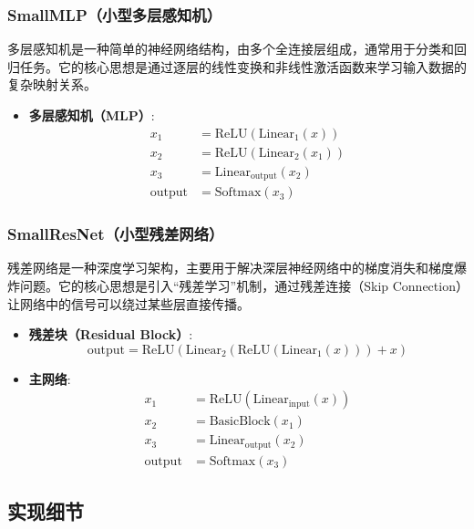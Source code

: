 \documentclass[10pt,a4paper,twoside]{article}
\numberwithin{figure}{section}%
\numberwithin{table}{section}%
\begin{document}
\subsubsection{SmallMLP（小型多层感知机）}

多层感知机是一种简单的神经网络结构，由多个全连接层组成，通常用于分类和回归任务。它的核心思想是通过逐层的线性变换和非线性激活函数来学习输入数据的复杂映射关系。

\begin{itemize}
    \item \textbf{多层感知机（MLP）}:
    $$\begin{aligned}
        x_1 &= \text{ReLU}(\text{Linear}_1(x)) \\
        x_2 &= \text{ReLU}(\text{Linear}_2(x_1)) \\
        x_3 &= \text{Linear}_{\text{output}}(x_2) \\
        \text{output} &= \text{Softmax}(x_3)
    \end{aligned}$$
\end{itemize}

\subsubsection{SmallResNet（小型残差网络）}

残差网络是一种深度学习架构，主要用于解决深层神经网络中的梯度消失和梯度爆炸问题。它的核心思想是引入“残差学习”机制，通过残差连接（Skip Connection）让网络中的信号可以绕过某些层直接传播。

\begin{itemize}
    \item \textbf{残差块（Residual Block）}:
    $$\text{output} = \text{ReLU}(\text{Linear}_2(\text{ReLU}(\text{Linear}_1(x))) + x)$$
    \item \textbf{主网络}:
    $$\begin{aligned}
        x_1 &= \text{ReLU}(\text{Linear}_{\text{input}}(x)) \\
        x_2 &= \text{BasicBlock}(x_1) \\
        x_3 &= \text{Linear}_{\text{output}}(x_2) \\
        \text{output} &= \text{Softmax}(x_3)
    \end{aligned}$$
\end{itemize}

\subsection{实现细节}
\end{document}
